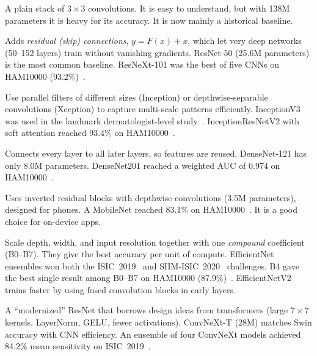 \documentclass[10pt,a4paper]{article}
\begin{document}
\begin{description}[leftmargin=0pt,style=unboxed,itemsep=3pt]
  \item[VGG16/19~\cite{simonyan2015vgg}.] A plain stack of $3\times3$
        convolutions. It is easy to understand, but with 138M
        parameters it is heavy for its accuracy. It is now mainly a
        historical baseline.
  \item[ResNet~\cite{he2016resnet}.] Adds \emph{residual (skip)
        connections}, $y = F(x) + x$, which let very deep networks
        (50--152 layers) train without vanishing gradients. ResNet-50
        (25.6M parameters) is the most common baseline. ResNeXt-101 was
        the best of five CNNs on HAM10000 (93.2\%)~\cite{chaturvedi2020mtap}.
  \item[Inception / Xception~\cite{szegedy2016inception,chollet2017xception}.]
        Use parallel filters of different sizes (Inception) or
        depthwise-separable convolutions (Xception) to capture
        multi-scale patterns efficiently. InceptionV3 was used in the
        landmark dermatologist-level study~\cite{esteva2017derm}.
        InceptionResNetV2 with soft attention reached 93.4\% on
        HAM10000~\cite{datta2021soft}.
  \item[DenseNet~\cite{huang2017densenet}.] Connects every layer to all
        later layers, so features are reused. DenseNet-121 has only
        8.0M parameters. DenseNet201 reached a weighted AUC of 0.974 on
        HAM10000~\cite{datta2021soft}.
  \item[MobileNetV2~\cite{sandler2018mobilenetv2}.] Uses inverted
        residual blocks with depthwise convolutions (3.5M parameters),
        designed for phones. A MobileNet reached 83.1\% on
        HAM10000~\cite{chaturvedi2020mobilenet}. It is a good choice for
        on-device apps.
  \item[EfficientNet / EfficientNetV2~\cite{tan2019efficientnet,tan2021efficientnetv2}.]
        Scale depth, width, and input resolution together with one
        \emph{compound} coefficient (B0--B7). They give the best accuracy
        per unit of compute. EfficientNet ensembles won both the
        ISIC~2019~\cite{gessert2020} and SIIM-ISIC~2020~\cite{ha2020siim}
        challenges. B4 gave the best single result among B0--B7 on
        HAM10000 (87.9\%)~\cite{ali2022efficientnets}. EfficientNetV2 trains
        faster by using fused convolution blocks in early layers.
  \item[ConvNeXt~\cite{liu2022convnext}.] A ``modernized'' ResNet that
        borrows design ideas from transformers (large $7\times7$ kernels,
        LayerNorm, GELU, fewer activations). ConvNeXt-T (28M) matches Swin
        accuracy with CNN efficiency. An ensemble of four ConvNeXt models
        achieved 84.2\% mean sensitivity on ISIC~2019~\cite{baykal2024convnext}.
\end{description}
\end{document}
